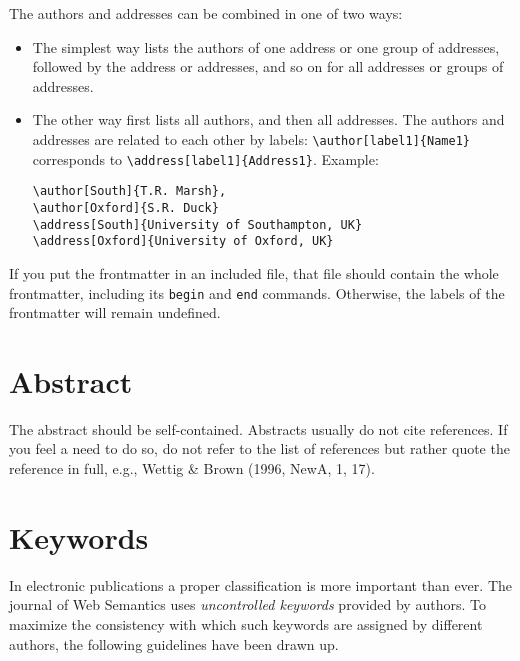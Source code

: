 \documentclass{elsart3p}    %
\begin{document}
The authors and addresses can be combined in one of two ways:
\begin{itemize}
\item The simplest way lists the authors of one address or one group
  of addresses, followed by the address or addresses, and so on for
  all addresses or groups of addresses.
\item The other way first lists all authors, and then all addresses.
The authors and addresses are related to each other by labels:
\verb|\author[label1]{Name1}| corresponds to
\verb|\address[label1]{Address1}|. Example:
\begin{verbatim}
\author[South]{T.R. Marsh},
\author[Oxford]{S.R. Duck}
\address[South]{University of Southampton, UK}
\address[Oxford]{University of Oxford, UK}
\end{verbatim}
\end{itemize}

If you put the frontmatter in an included file, that file should
contain the whole frontmatter, including its \texttt{begin} and
\texttt{end} commands. Otherwise, the labels of the frontmatter will
remain undefined.


\section{Abstract}

The abstract should be self-contained. Abstracts usually do
not cite references.  If you feel a need to do so, do not
refer to the list of references but rather quote the
reference in full, e.g., Wettig \& Brown (1996, NewA, 1,
17).

\section{Keywords}
\label{keywd}
\enlargethispage*{2.5pc}

In electronic publications a proper classification is more
important than ever. The journal of Web Semantics uses {\em
uncontrolled keywords} provided by authors.  To maximize the
consistency with which such keywords are assigned by different
authors, the following guidelines have been drawn up.
\end{document}
